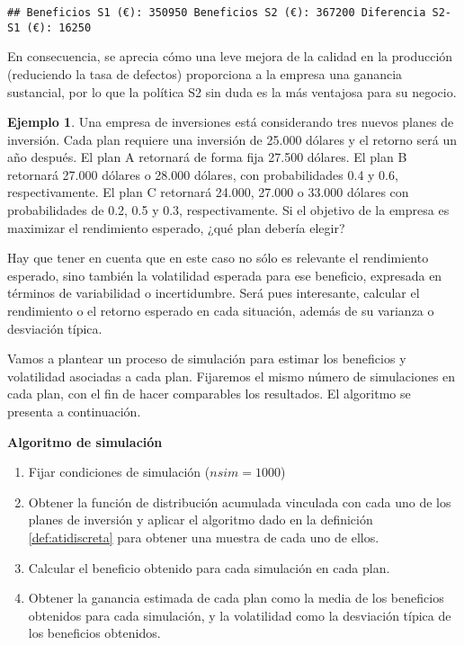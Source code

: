 \documentclass[
]{book}
\providecommand{\tightlist}{%
  \setlength{\itemsep}{0pt}\setlength{\parskip}{0pt}}
\newenvironment{silverbox}{
  \definecolor{shadecolor}{rgb}{192, 192, 192}  
  \color{black}
  \begin{shaded}}
 {\end{shaded}}
\theoremstyle{definition}
\theoremstyle{definition}
\newtheorem{example}{Ejemplo}[chapter]
\theoremstyle{definition}
\theoremstyle{definition}
\theoremstyle{remark}
\begin{document}
\begin{verbatim}
## Beneficios S1 (€): 350950 Beneficios S2 (€): 367200 Diferencia S2-S1 (€): 16250
\end{verbatim}

En consecuencia, se aprecia cómo una leve mejora de la calidad en la producción (reduciendo la tasa de defectos) proporciona a la empresa una ganancia sustancial, por lo que la política S2 sin duda es la más ventajosa para su negocio.

\begin{example}
\protect\hypertarget{exm:discreta2}{}\label{exm:discreta2}Una empresa de inversiones está considerando tres nuevos planes de inversión. Cada plan requiere una inversión de 25.000 dólares y el retorno será un año después. El plan A retornará de forma fija 27.500 dólares. El plan B retornará 27.000 dólares o 28.000 dólares, con probabilidades 0.4 y 0.6, respectivamente. El plan C retornará 24.000, 27.000 o 33.000 dólares con probabilidades de 0.2, 0.5 y 0.3, respectivamente. Si el objetivo de la empresa es maximizar el rendimiento esperado, ¿qué plan debería elegir?
\end{example}

Hay que tener en cuenta que en este caso no sólo es relevante el rendimiento esperado, sino también la volatilidad esperada para ese beneficio, expresada en términos de variabilidad o incertidumbre. Será pues interesante, calcular el rendimiento o el retorno esperado en cada situación, además de su varianza o desviación típica.

Vamos a plantear un proceso de simulación para estimar los beneficios y volatilidad asociadas a cada plan. Fijaremos el mismo número de simulaciones en cada plan, con el fin de hacer comparables los resultados. El algoritmo se presenta a continuación.

\begin{silverbox}

\textbf{Algoritmo de simulación}

\begin{enumerate}
\def\labelenumi{\arabic{enumi}.}
\tightlist
\item
  Fijar condiciones de simulación (\(nsim = 1000\))
\item
  Obtener la función de distribución acumulada vinculada con cada uno de los planes de inversión y aplicar el algoritmo dado en la definición \ref{def:atidiscreta} para obtener una muestra de cada uno de ellos.
\item
  Calcular el beneficio obtenido para cada simulación en cada plan.
\item
  Obtener la ganancia estimada de cada plan como la media de los beneficios obtenidos para cada simulación, y la volatilidad como la desviación típica de los beneficios obtenidos.
\end{enumerate}

\end{silverbox}
\end{document}

